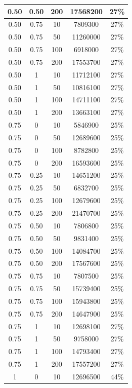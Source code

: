 \documentclass[a4paper,12pt]{report}
\begin{document}
\begin{longtable}{ | c | c | c | c | c | }
			0.50 & 0.50 & 200 & 17568200 & 27\% \\ \hline
			0.50 & 0.75 & 10 & 7809300 & 27\%  \\ \hline
			0.50 & 0.75 & 50 & 11260000 & 27\%  \\ \hline
			0.50 & 0.75 & 100 & 6918000 & 27\%  \\ \hline
			0.50 & 0.75 & 200 & 17553700 & 27\%  \\ \hline
			0.50 & 1 & 10 & 11712100 & 27\%  \\ \hline
			0.50 & 1 & 50 & 10816100 & 27\%  \\ \hline
			0.50 & 1 & 100 & 14711100 & 27\%  \\ \hline
			0.50 & 1 & 200 & 13663100 & 27\%  \\ \hline
			0.75 & 0 & 10 & 5846900 & 25\%  \\ \hline
			0.75 & 0 & 50 & 12689600 & 25\%  \\ \hline
			0.75 & 0 & 100 & 8782800 & 25\%  \\ \hline
			0.75 & 0 & 200 & 16593600 & 25\%  \\ \hline
			0.75 & 0.25 & 10 & 14651200 & 25\%  \\ \hline
			0.75 & 0.25 & 50 & 6832700 & 25\%  \\ \hline
			0.75 & 0.25 & 100 & 12679600 & 25\%  \\ \hline
			0.75 & 0.25 & 200 & 21470700 & 25\%  \\ \hline
			0.75 & 0.50 & 10 & 7806800 & 25\%  \\ \hline
			0.75 & 0.50 & 50 & 9831400 & 25\%  \\ \hline
			0.75 & 0.50 & 100 & 14084700 & 25\%  \\ \hline
			0.75 & 0.50 & 200 & 17567600 & 25\%  \\ \hline
			0.75 & 0.75 & 10 & 7807500 & 25\%  \\ \hline
			0.75 & 0.75 & 50 & 15739400 & 25\%  \\ \hline
			0.75 & 0.75 & 100 & 15943800 & 25\%  \\ \hline
			0.75 & 0.75 & 200 & 14647900 & 25\%  \\ \hline
			0.75 & 1 & 10 & 12698100 & 27\%  \\ \hline
			0.75 & 1 & 50 & 9758000 & 27\%  \\ \hline
			0.75 & 1 & 100 & 14793400 & 27\%  \\ \hline
			0.75 & 1 & 200 & 17557200 & 27\%  \\ \hline
			1 & 0 & 10 & 12696500 & 44\% \\ \hline

\end{longtable}
\end{document}

